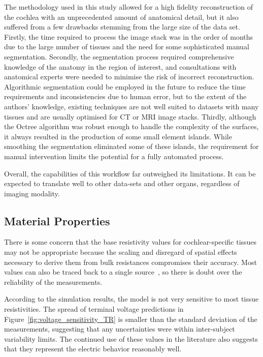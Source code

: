 The methodology used in this study allowed for a high fidelity reconstruction of
the cochlea with an unprecedented amount of anatomical detail, but it also
suffered from a few drawbacks stemming from the large size of the data set.
Firstly, the time required to process the image stack was in the order of months
due to the large number of tissues and the need for some sophisticated manual
segmentation. Secondly, the segmentation process required comprehensive
knowledge of the anatomy in the region of interest, and consultations with
anatomical experts were needed to minimise the risk of incorrect reconstruction.
Algorithmic segmentation could be employed in the future to reduce the time
requirements and inconsistencies due to human error, but to the extent of the
authors' knowledge, existing techniques are not well suited to datasets with
many tissues and are usually optimised for CT or MRI image stacks. Thirdly,
although the Octree algorithm was robust enough to handle the complexity of the
surfaces, it always resulted in the production of some small element islands.
While smoothing the segmentation eliminated some of these islands, the
requirement for manual intervention limits the potential for a fully automated
process.

Overall, the capabilities of this workflow far outweighed its limitations. It
can be expected to translate well to other data-sets and other organs,
regardless of imaging modality.

\subsection{Material Properties}

There is some concern that the base resistivity values for cochlear-specific
tissues may not be appropriate because the scaling and disregard of spatial
effects necessary to derive them from bulk resistances compromises their
accuracy\cite{girzon1987,finley1990,frijns1995,micco2006}. Most values can also
be traced back to a single source~\cite{strelioff1973}, so there is doubt over
the reliability of the measurements.

According to the simulation results, the model is not very sensitive to most
tissue resistivities. The spread of terminal voltage predictions in
Figure~\ref{fig:voltage_sensitivity_TR} is smaller than the standard deviation
of the \invivo{} measurements, suggesting that any uncertainties were within
inter-subject variability limits. The continued use of these values in the
literature also suggests that they represent the electric behavior reasonably
well.

